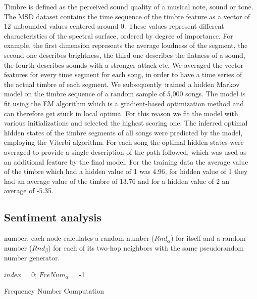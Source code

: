 \documentclass[acmtog, authorversion]{acmart}
\begin{document}
Timbre is defined as the perceived sound quality of a musical note, sound or tone. The MSD dataset contains the time sequence of the timbre feature as a vector of 12 unbounded values centered around 0. These values represent different characteristics of the spectral
surface, ordered by degree of importance. For example, the first dimension represents the average
loudness of the segment, the second one describes brightness, the third one describes the flatness of a sound, the fourth describes sounds with a stronger attack etc. We averaged the vector features for every time segment for each song, in order to have a time series of the actual timbre of each segment.
We subsequently trained a hidden Markov model on the timbre sequence of a random sample of 5,000 songs. The model is fit using the EM algorithm which is a gradient-based optimization method and can therefore get stuck in local optima. For this reason we fit the model with various initializations and selected the highest scoring one.
The inferred optimal hidden states of the timbre segments of all songs were predicted by the model, employing the Viterbi algorithm.
For each song the optimal hidden states were averaged to provide a single description of the path followed, which was used as an additional feature by the final model.
For the training data the average value of the timbre which had a hidden value of 1 was 4.96, for hidden value of 1 they had an average value of the timbre of 13.76 and for a hidden value of 2 an average of -5.35.

\subsection{Sentiment analysis}

number, each node calculates a random number (${\textit{Rnd}}_{\alpha}$) for
itself and a random number (${\textit{Rnd}}_{\beta}$) for each of its two-hop
neighbors with the same pseudorandom number generator.

\begin{algorithm}[t]
\SetAlgoNoLine
{}
$index$ = 0; $FreNum_{\alpha}$ = -1\;
\caption{Frequency Number Computation}
\label{alg:one}
\end{algorithm}
\end{document}
